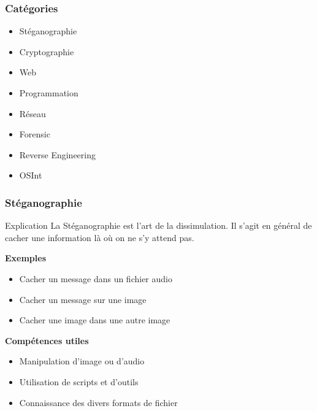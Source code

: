 \documentclass{beamer}
\begin{document}
\begin{frame}\frametitle{Catégories}

\begin{itemize}
    \item Stéganographie
    \item Cryptographie
    \item Web
    \item Programmation
    \item Réseau
    \item Forensic
    \item Reverse Engineering
    \item OSInt
\end{itemize}

\end{frame}


\begin{frame}
\frametitle{Stéganographie}

\begin{block}{Explication}
    La Stéganographie est l’art de la dissimulation. Il s’agit en général de cacher une information là où on ne s’y attend pas.
\end{block}

\pause

\textbf{Exemples}
\begin{itemize}
    \item Cacher un message dans un fichier audio
    \item Cacher un message sur une image
    \item Cacher une image dans une autre image
\end{itemize}

\pause

\textbf{Compétences utiles}
\begin{itemize}
    \item Manipulation d'image ou d'audio \\
    \item Utilisation de scripts et d'outils\\
    \item Connaissance des divers formats de fichier
\end{itemize}

\end{frame}

\end{document}
